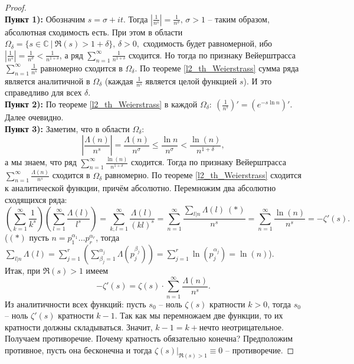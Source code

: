 \begin{proof}~\\
	\textbf{Пункт 1):} Обозначим $s=\sigma+it.$ Тогда $\displaystyle \left| \frac{1}{n^s} \right| = \frac{1}{n^\sigma},\,\sigma > 1$ -- таким образом, абсолютная сходимость есть. При этом в области $\Omega_\delta = \{ s \in \mathbb{C} \ | \ \Re(s) > 1+\delta \},\, \delta>0,$ сходимость будет равномерной, ибо $\displaystyle \left| \frac{1}{n^s} \right| = \frac{1}{n^\sigma} < \frac{1}{n^{1+\delta}}$, а ряд $\displaystyle \sum\limits_{n=1}^\infty \frac{1}{n^{1+\delta}}$ сходится. Но тогда по признаку Вейерштрасса $\displaystyle \sum\limits_{n=1}^\infty \frac{1}{n^s}$ равномерно сходится в $\Omega_\delta.$ По теореме \ref{l2_th_Weierstrass} сумма ряда является аналитичной в $\Omega_\delta$ (каждая $\displaystyle \frac{1}{n^s}$ является целой функцией $s$). И это справедливо для всех $\delta$.\\
	\textbf{Пункт 2):} По теореме \ref{l2_th_Weierstrass} в каждой $\displaystyle \Omega_\delta: \ \left(\frac{1}{n^s}\right)' = \left(e^{-s \ln n}\right)'.$ Далее очевидно.\\
	\textbf{Пункт 3):} Заметим, что в области $\displaystyle \Omega_\delta:$ $$\left| \frac{\Lambda(n)}{n^s} \right| = \frac{\Lambda(n)}{n^\sigma} \leq \frac{\ln n}{n^\sigma} < \frac{\ln(n)}{n^{1+\delta}},$$ а мы знаем, что ряд $\displaystyle \sum\limits_{n=1}^\infty \frac{\ln(n)}{n^{1+\delta}}$ сходится. Тогда по признаку Вейерштрасса $\displaystyle \sum\limits_{n=1}^\infty \frac{\Lambda(n)}{n^s}$ сходится в $\Omega_\delta$ равномерно. По теореме \ref{l2_th_Weierstrass} сходится к аналитической функции, причём абсолютно. Перемножим два абсолютно сходящихся ряда: 
		$$\left( \sum\limits_{k=1}^\infty \frac{1}{k^s} \right)\left( \sum\limits_{l=1}^\infty \frac{\Lambda(l)}{l^s} \right) = \sum\limits_{k,l=1}^\infty \frac{\Lambda(l)}{(kl)^s} = \sum\limits_{n=1}^\infty \frac{\sum_{l | n}\Lambda(l) \ (\ast)}{n^s} = \sum\limits_{n=1}^\infty \frac{\ln(n)}{n^s} = -\zeta'(s).$$
		($(\ast)$ пусть $n = p_1^{\alpha_1}\dots p_r^{\alpha_r}$, тогда $\displaystyle \sum\limits_{l | n}\Lambda(l) = \sum\limits_{j=1}^r \left( \sum\limits_{\beta_j=1}^{\alpha_j} \Lambda\left(p_j^{\beta_j} \right) \right) = \sum\limits_{j=1}^r \ln\left( p_j^{\alpha_j} \right) = \ln(n)$).\\
	Итак, при $\Re(s)>1$ имеем 
		$$-\zeta'(s) = \zeta(s) \cdot \sum\limits_{n=1}^\infty \frac{\Lambda(n)}{n^s}.$$ 
	Из аналитичности всех функций: пусть $s_0$ -- ноль $\zeta(s)$ кратности $k>0$, тогда $s_0$ -- ноль $\zeta'(s)$ кратности $k-1$. Так как мы перемножаем две функции, то их кратности должны складываться. Значит, $k-1=k+$нечто неотрицательное.  Получаем противоречие. Почему кратность обязательно конечна? Предположим противное, пусть она бесконечна и тогда $\zeta(s)|_{\Re(s)>1} \equiv 0$ -- противоречие.
\end{proof}

